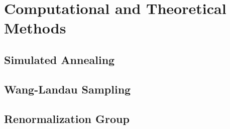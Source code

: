 

\chapter{Computational and Theoretical Methods}
\label{chap-methods}

\section{Simulated Annealing}

\section{Wang-Landau Sampling}

\section{Renormalization Group}